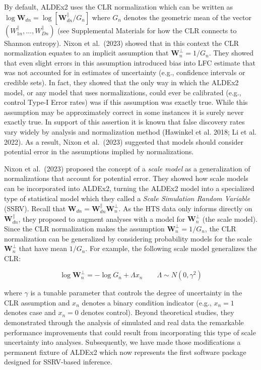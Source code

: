 \documentclass[
]{article}
\begin{document}
By default, ALDEx2 uses the CLR normalization which can be written as
\(\log \mathbf{W}_{dn}=\log [\mathbf{W}^{\parallel}_{dn}/G_{n}]\) where
\(G_{n}\) denotes the geometric mean of the vector
\((W^{\parallel}_{1n}, \dots, W^{\parallel}_{Dn})\) (see Supplemental
Materials for how the CLR connects to Shannon entropy). Nixon et
al.~(2023) showed that in this context the CLR normalization equates to
an implicit assumption that \(\mathbf{W}^{\perp}_{n}=1/G_{n}\). They
showed that even slight errors in this assumption introduced bias into
LFC estimate that was not accounted for in estimates of uncertainty
(e.g., confidence intervals or credible sets). In fact, they showed that
the only way in which the ALDEx2 model, or any model that uses
normalizations, could ever be calibrated (e.g., control Type-I Error
rates) was if this assumption was exactly true. While this assumption
may be approximately correct in some instances it is surely never
exactly true. In support of this assertion it is known that false
discovery rates vary widely by analysis and normalization method
(Hawinkel et al. 2018; Li et al. 2022). As a result, Nixon et al.~(2023)
suggested that models should consider potential error in the assumptions
implied by normalizations.

Nixon et al.~(2023) proposed the concept of a \textit{scale model} as a
generalization of normalizations that account for potential error. They
showed how scale models can be incorporated into ALDEx2, turning the
ALDEx2 model into a specialized type of statistical model which they
called a \textit{Scale Simulation Random   Variable} (SSRV). Recall that
\(\mathbf{W}_{dn}=\mathbf{W}^{\parallel}_{dn}\mathbf{W}^{\perp}_{n}\).
As the HTS data only informs directly on
\(\mathbf{W}^{\parallel}_{dn}\), they proposed to augment analyses with
a model for \(\mathbf{W}^{\perp}_{n}\) (the scale model). Since the CLR
normalization makes the assumption \(\mathbf{W}^{\perp}_{n}=1/G_{n}\),
the CLR normalization can be generalized by considering probability
models for the scale \(\mathbf{W}^{\perp}_{n}\) that have mean
\(1/G_{n}\). For example, the following scale model generalizes the CLR:

\[\log \mathbf{W}^{\perp}_{n} = -\log G_{n} + \Lambda x_{n} \qquad \Lambda \sim N(0, \gamma^{2})\]

where \(\gamma\) is a tunable parameter that controls the degree of
uncertainty in the CLR assumption and \(x_{n}\) denotes a binary
condition indicator (e.g., \(x_{n}=1\) denotes case and \(x_{n}=0\)
denotes control). Beyond theoretical studies, they demonstrated through
the analysis of simulated and real data the remarkable performance
improvements that could result from incorporating this type of scale
uncertainty into analyses. Subsequently, we have made those
modifications a permanent fixture of ALDEx2 which now represents the
first software package designed for SSRV-based inference.
\end{document}

